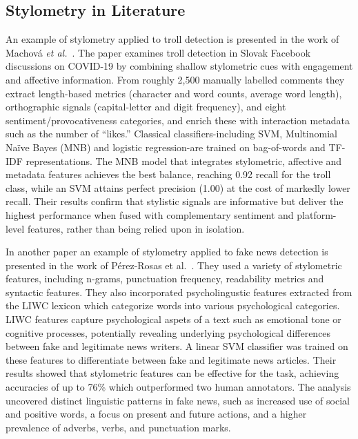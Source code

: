 \documentclass[twoside]{ctuthesis}
\theoremstyle{plain}
\theoremstyle{definition}
\theoremstyle{note}
\begin{document}
\subsection{Stylometry in Literature}

An example of stylometry applied to troll detection is presented in the work of Machová \textit{et al.}~\cite{Machova2021Algorithms}. The paper examines troll detection in Slovak Facebook discussions on COVID-19 by combining shallow stylometric cues with engagement and affective information.  From roughly 2,500 manually labelled comments they extract length-based metrics (character and word counts, average word length), orthographic signals (capital-letter and digit frequency), and eight sentiment/provocativeness categories, and enrich these with interaction metadata such as the number of “likes.”  Classical classifiers-including SVM, Multinomial Naïve Bayes (MNB) and logistic regression-are trained on bag-of-words and TF-IDF representations.  The MNB model that integrates stylometric, affective and metadata features achieves the best balance, reaching 0.92 recall for the troll class, while an SVM attains perfect precision (1.00) at the cost of markedly lower recall.  Their results confirm that stylistic signals are informative but deliver the highest performance when fused with complementary sentiment and platform-level features, rather than being relied upon in isolation.

In another paper an example of stylometry applied to fake news detection is presented in the work of Pérez-Rosas et al.~\cite{PerezRosas2018Stylometry}. They used a variety of stylometric features, including n-grams, punctuation frequency, readability metrics and syntactic features. They also incorporated psycholingustic features extracted from the LIWC lexicon which categorize words into various psychological categories. LIWC features capture psychological aspets of a text such as emotional tone or cognitive processes, potentially revealing underlying psychological differences between fake and legitimate news writers. A linear SVM classifier was trained on these features to differentiate between fake and legitimate news articles. Their results showed that stylometric features can be effective for the task, achieving accuracies of up to 76\% which outperformed two human annotators. The analysis uncovered distinct linguistic patterns in fake news, such as increased use of social and positive words, a focus on present and future actions, and a higher prevalence of adverbs, verbs, and punctuation marks. 
\end{document}
